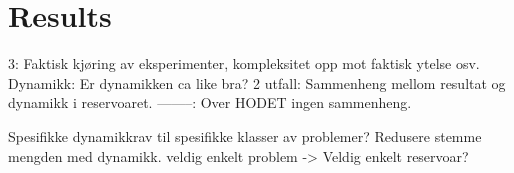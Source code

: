 \section{Results}

3: Faktisk kjøring av eksperimenter, kompleksitet opp mot faktisk ytelse osv.
Dynamikk: Er dynamikken ca like bra?
2 utfall: Sammenheng mellom resultat og dynamikk i reservoaret.
--------: Over HODET ingen sammenheng.

Spesifikke dynamikkrav til spesifikke klasser av problemer?
Redusere stemme mengden med dynamikk.
veldig enkelt problem -> Veldig enkelt reservoar?
